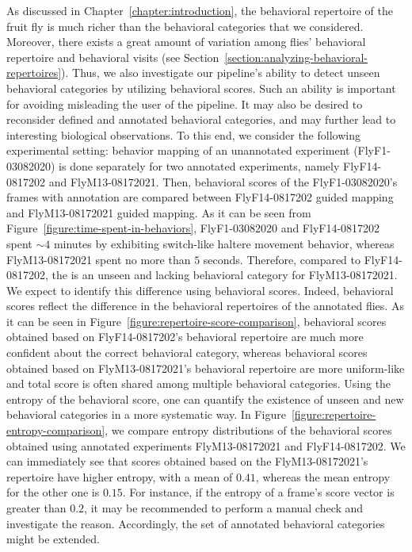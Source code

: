 As discussed in Chapter~\ref{chapter:introduction}, the behavioral repertoire of the fruit fly is much richer than the behavioral categories that we considered.
Moreover, there exists a great amount of variation among flies' behavioral repertoire and behavioral visits (see Section~\ref{section:analyzing-behavioral-repertoires}).
Thus, we also investigate our pipeline's ability to detect unseen behavioral categories by utilizing behavioral scores.
Such an ability is important for avoiding misleading the user of the pipeline. It may also be desired to reconsider defined and annotated behavioral categories, and may further lead to interesting biological observations.
To this end, we consider the following experimental setting: behavior mapping of an unannotated experiment (FlyF1-03082020) is done separately for two annotated experiments, namely FlyF14-0817202 and FlyM13-08172021.
Then, behavioral scores of the FlyF1-03082020's frames with \HaltereSwitch annotation are compared between FlyF14-0817202 guided mapping and FlyM13-08172021 guided mapping.
As it can be seen from Figure~\ref{figure:time-spent-in-behaviors}, FlyF1-03082020 and FlyF14-0817202 spent ${\sim}4$ minutes by exhibiting switch-like haltere movement behavior, whereas FlyM13-08172021 spent no more than $5$ seconds.
Therefore, compared to FlyF14-0817202, the \HaltereSwitch is an unseen and lacking behavioral category for FlyM13-08172021.
We expect to identify this difference using behavioral scores.
Indeed, behavioral scores reflect the difference in the behavioral repertoires of the annotated flies.
As it can be seen in Figure~\ref{figure:repertoire-score-comparison}, behavioral scores obtained based on FlyF14-0817202's behavioral repertoire are much more confident about the correct behavioral category, whereas behavioral scores obtained based on FlyM13-08172021's behavioral repertoire are more uniform-like and total score is often shared among multiple behavioral categories.
Using the entropy of the behavioral score, one can quantify the existence of unseen and new behavioral categories in a more systematic way.
In Figure~\ref{figure:repertoire-entropy-comparison}, we compare entropy distributions of the behavioral scores obtained using annotated experiments FlyM13-08172021 and FlyF14-0817202.
We can immediately see that scores obtained based on the FlyM13-08172021's repertoire have higher entropy, with a mean of $0.41$, whereas the mean entropy for the other one is $0.15$.
For instance, if the entropy of a frame's score vector is greater than $0.2$, it may be recommended to perform a manual check and investigate the reason.
Accordingly, the set of annotated behavioral categories might be extended.

